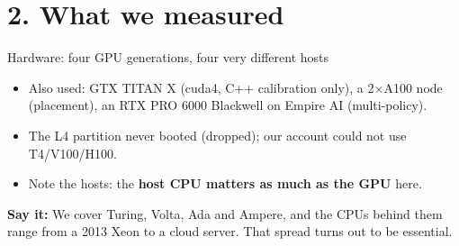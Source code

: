 \documentclass[aspectratio=169,10pt]{beamer}
\newcommand{\say}[1]{\par\vfill\noindent\colorbox{soft}{\parbox{\dimexpr\textwidth-2\fboxsep\relax}{\small\textbf{\textcolor{accent}{Say it:}} #1}}}
\begin{document}
\section{2. What we measured}

\begin{frame}{Hardware: four GPU generations, four very different hosts}
\centering\small
{}
\vspace{0.8em}
\begin{itemize}
\item Also used: GTX TITAN X (cuda4, C++ calibration only), a 2$\times$A100 node (placement),
  an RTX PRO 6000 Blackwell on Empire AI (multi-policy).
\item The L4 partition never booted (dropped); our account could not use T4/V100/H100.
\item Note the hosts: the \textbf{host CPU matters as much as the GPU} here.
\end{itemize}
\say{We cover Turing, Volta, Ada and Ampere, and the CPUs behind them range from a 2013 Xeon to
a cloud server. That spread turns out to be essential.}
\end{frame}
\end{document}
